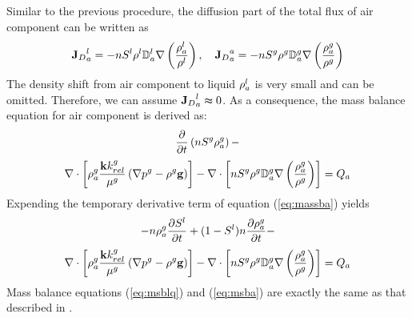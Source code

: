 Similar to the previous procedure, the diffusion part of the total flux of air component can be written as
\begin{align}
{{\mathbf{J}}_D}_a^{l}=-n S^{l}  \rho^{l} {\mathbb D}_a^{l} \nabla \left(\dfrac{\rho_a^{l}}{\rho^{l}}\right),\quad
{{\mathbf{J}}_D}_a^{a}=-n S^{g}  \rho^{g} {\mathbb D}_a^{g} \nabla \left(\dfrac{\rho_a^{g}}{\rho^{g}}\right)
\label{eq:flx_fka}
\end{align}
The density shift from air component to liquid ${\rho_a^{l}}$ is very small and can be omitted. Therefore, we can assume ${{\mathbf{J}}_D}_a^{l}\thickapprox0$. As a consequence, the mass balance equation for air component is derived as:
$$\dfrac{\partial }{\partial t} \left(n S^g\rho_a^g\right) -$$
\begin{align}
\nabla \cdot \left[\rho_a^{g}\dfrac{\mathbf k k_{rel}^{g}}{\mu^{g}}\left(\nabla p^{g}-\rho^{g} \mathbf g\right)\right]-\nabla \cdot \left[n S^{g}  \rho^{g} {\mathbb D}_a^{g} \nabla \left(\dfrac{\rho_a^{g}}{\rho^{g}}\right)\right] =Q_a
\label{eq:massba}
\end{align}
Expending the temporary derivative term of equation (\ref{eq:massba}) yields
$$-n \rho_a^g \dfrac{\partial S^l}{\partial t} + (1 -S^l)n \dfrac{\partial \rho_a^{g}}{\partial t}-$$
\begin{align}
\nabla \cdot \left[\rho_a^{g}\dfrac{\mathbf k k_{rel}^{g}}{\mu^{g}}\left(\nabla p^{g}-\rho^{g} \mathbf g\right)\right] -
\nabla \cdot \left[n S^{g} \rho^{g} {\mathbb D}_a^{g} \nabla \left(\dfrac{\rho_a^{g}}{\rho^{g}}\right)\right] = Q_a
\label{eq:msba}
\end{align}
Mass balance equations (\ref{eq:msblq}) and (\ref{eq:msba}) are exactly the same as that described in \cite{SanPesSch:06}.
